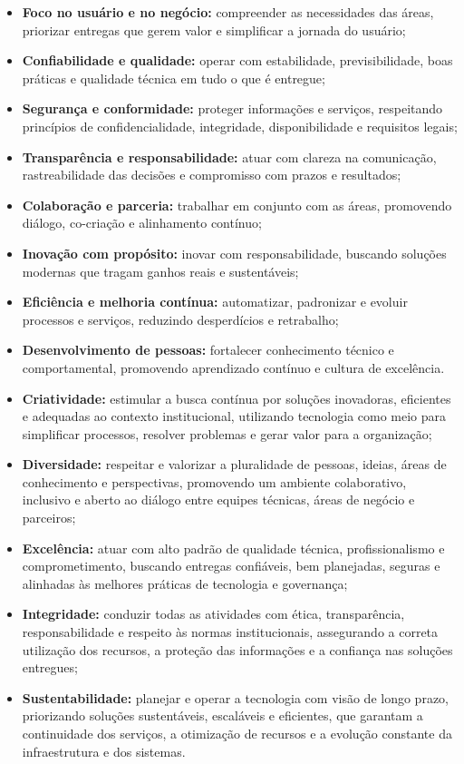 \documentclass[12pt,a4paper]{article}
\begin{document}
\begin{itemize}
  \item \textbf{Foco no usuário e no negócio:} compreender as necessidades das áreas, priorizar entregas que gerem valor e simplificar a jornada do usuário;
  \item \textbf{Confiabilidade e qualidade:} operar com estabilidade, previsibilidade, boas práticas e qualidade técnica em tudo o que é entregue;
  \item \textbf{Segurança e conformidade:} proteger informações e serviços, respeitando princípios de confidencialidade, integridade, disponibilidade e requisitos legais;
  \item \textbf{Transparência e responsabilidade:} atuar com clareza na comunicação, rastreabilidade das decisões e compromisso com prazos e resultados;
  \item \textbf{Colaboração e parceria:} trabalhar em conjunto com as áreas, promovendo diálogo, co-criação e alinhamento contínuo;
  \item \textbf{Inovação com propósito:} inovar com responsabilidade, buscando soluções modernas que tragam ganhos reais e sustentáveis;
  \item \textbf{Eficiência e melhoria contínua:} automatizar, padronizar e evoluir processos e serviços, reduzindo desperdícios e retrabalho;
  \item \textbf{Desenvolvimento de pessoas:} fortalecer conhecimento técnico e comportamental, promovendo aprendizado contínuo e cultura de excelência.
  \item \textbf{Criatividade:} estimular a busca contínua por soluções inovadoras, eficientes e adequadas ao contexto institucional, utilizando tecnologia como meio para simplificar processos, resolver problemas e gerar valor para a organização;
  \item \textbf{Diversidade:} respeitar e valorizar a pluralidade de pessoas, ideias, áreas de conhecimento e perspectivas, promovendo um ambiente colaborativo, inclusivo e aberto ao diálogo entre equipes técnicas, áreas de negócio e parceiros;
  \item \textbf{Excelência:} atuar com alto padrão de qualidade técnica, profissionalismo e comprometimento, buscando entregas confiáveis, bem planejadas, seguras e alinhadas às melhores práticas de tecnologia e governança;
  \item \textbf{Integridade:} conduzir todas as atividades com ética, transparência, responsabilidade e respeito às normas institucionais, assegurando a correta utilização dos recursos, a proteção das informações e a confiança nas soluções entregues;
  \item \textbf{Sustentabilidade:} planejar e operar a tecnologia com visão de longo prazo, priorizando soluções sustentáveis, escaláveis e eficientes, que garantam a continuidade dos serviços, a otimização de recursos e a evolução constante da infraestrutura e dos sistemas.
\end{itemize}
\end{document}
